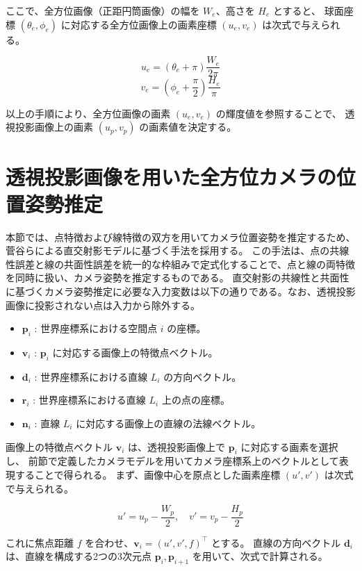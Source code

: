 ここで、全方位画像（正距円筒画像）の幅を $W_e$、高さを $H_e$ とすると、
球面座標 $(\theta_e, \phi_e)$ に対応する全方位画像上の画素座標 $(u_e, v_e)$ は次式で与えられる。

\begin{equation}
u_e = \left( \theta_e + \pi \right) \frac{W_e}{2\pi}
\end{equation}
\begin{equation}
v_e = \left( \phi_e + \frac{\pi}{2} \right) \frac{H_e}{\pi}
\end{equation}

以上の手順により、全方位画像の画素 $(u_e, v_e)$ の輝度値を参照することで、
透視投影画像上の画素 $(u_p, v_p)$ の画素値を決定する。


\section{透視投影画像を用いた全方位カメラの位置姿勢推定}
本節では、点特徴および線特徴の双方を用いてカメラ位置姿勢を推定するため、菅谷ら\cite{Sugaya2024}による直交射影モデルに基づく手法を採用する。
この手法は、点の共線性誤差と線の共面性誤差を統一的な枠組みで定式化することで、点と線の両特徴を同時に扱い、カメラ姿勢を推定するものである。
直交射影の共線性と共面性に基づくカメラ姿勢推定に必要な入力変数は以下の通りである。なお、透視投影画像に投影されない点は入力から除外する。
\begin{itemize}
  \item $\bm{p}_i$ : 世界座標系における空間点 $i$ の座標。
  \item $\bm{v}_i$ : $\bm{p}_i$ に対応する画像上の特徴点ベクトル。
  \item $\bm{d}_i$ : 世界座標系における直線 $L_i$ の方向ベクトル。
  \item $\bm{r}_i$ : 世界座標系における直線 $L_i$ 上の点の座標。
  \item $\bm{n}_i$ : 直線 $L_i$ に対応する画像上の直線の法線ベクトル。
\end{itemize}
画像上の特徴点ベクトル $\bm{v}_i$ は、透視投影画像上で $\bm{p}_i$ に対応する画素を選択し、
前節で定義したカメラモデルを用いてカメラ座標系上のベクトルとして表現することで得られる。
まず、画像中心を原点とした画素座標 $(u', v')$ は次式で与えられる。

\begin{equation}
  u' = u_p - \frac{W_p}{2}, \quad v' = v_p - \frac{H_p}{2}
\end{equation}

これに焦点距離 $f$ を合わせ、$\bm{v}_i = (u', v', f)^\top$ とする。
直線の方向ベクトル $\bm{d}_i$ は、直線を構成する2つの3次元点 $\bm{p}_i, \bm{p}_{i+1}$ を用いて、次式で計算される。

